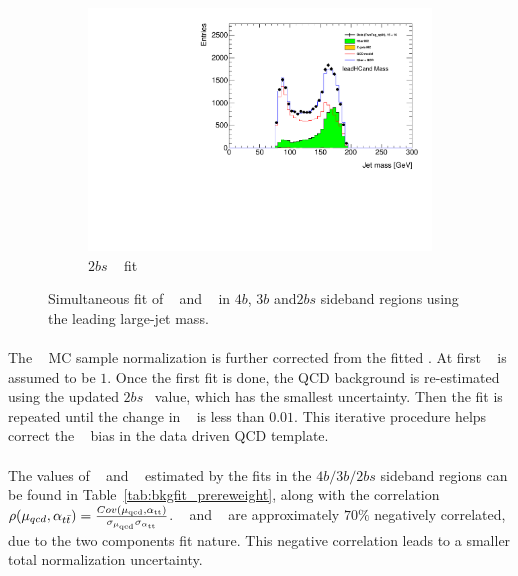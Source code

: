 \begin{figure}[htbp!]
    \hspace{-4cm}
    \begin{subfigure}[b]{0.3\textwidth}
        \includegraphics[width=\textwidth,angle=-90]{figures/boosted/Fit/fitNorm_i2s.pdf}
        \caption{$2bs$ \mleadJ~ fit}
        \label{fig:ttbar-fit-2bs}
    \end{subfigure}
   \caption{Simultaneous fit of \muqcd~ and \alphatt~ in $4b$, $3b$ and$2bs$ sideband regions using the leading large-\R jet mass.}
  \label{fig:ttbar-fit}
\end{figure}

\paragraph{}
The \ttbar~ MC sample normalization is further corrected from the fitted \alphatt.
At first \alphatt~ is assumed to be $1$.
Once the first fit is done, the QCD background is re-estimated using the updated $2bs$ \alphatt~value, which has the smallest uncertainty.
Then the fit is repeated until the change in \alphatt~ is less than $0.01$.
This iterative procedure helps correct the \alphatt~ bias in the data driven QCD template.

\paragraph{}
The values of \muqcd~ and \alphatt~ estimated by the fits in the $4b/3b/2bs$ sideband regions can be found in Table~\ref{tab:bkgfit_prereweight}, along with the correlation $\rho(\mu_{qcd},\alpha_{t\bar{t}}) = \frac{Cov(\rm \mu_{qcd},\rm \alpha_{tt})}{\rm \sigma_{\mu_{qcd}} \rm \sigma_{\alpha_{tt}} }$. 
\muqcd~ and \alphatt~  are approximately $70\%$ negatively correlated, due to the two components fit nature.
This negative correlation leads to a smaller total normalization uncertainty.

